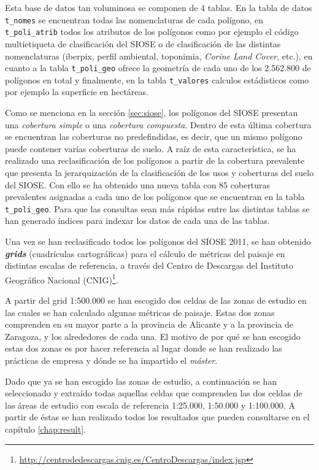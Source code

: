 Esta base de datos tan voluminosa se componen de 4 tablas. En la tabla de datos \texttt{t\_nomes} se encuentran todas las nomenclaturas de cada polígono, en \texttt{t\_poli\_atrib} todos los atributos de los polígonos como por ejemplo el código multietiqueta de clasificación del SIOSE o de clasificación de las distintas nomenclaturas (iberpix, perfil ambiental, toponimia, \textit{Corine Land Cover}, etc.), en cuanto a la tabla \texttt{t\_poli\_geo} ofrece la geometría de cada uno de los 2.562.800 de polígonos en total y finalmente, en la tabla \texttt{t\_valores} calculos estádisticos como por ejemplo la superficie en hectáreas.

Como se menciona en la sección \ref{sec:siose}, los polígonos del SIOSE presentan una \textit{cobertura simple} o una \textit{cobertura compuesta}. Dentro de esta última cobertura se encuentran las coberturas no predefindidas, es decir, que un mismo polígono puede contener varías coberturas de suelo. A raíz de esta característica, se ha realizado una reclasificación de los polígonos a partir de la cobertura prevalente que presenta la jerarquización de la clasificación de los usos y coberturas del suelo del SIOSE. Con ello se ha obtenido una nueva tabla con 85 coberturas prevalentes asignadas a cada uno de los polígonos que se encuentran en la tabla \texttt{t\_poli\_geo}. Para que las consultas sean más rápidas entre las distintas tablas se han generado índices para indexar los datos de cada una de las tablas. 

Una vez se han reclasificado todos los polígonos del SIOSE 2011, se han obtenido \textbf{\textit{grids}} (cuadrículas cartográficas) para el cálculo de métricas del paisaje en distintas escalas de referencia, a través del Centro de Descargas del Instituto Geográfico Nacional (CNIG)\footnote{\url{http://centrodedescargas.cnig.es/CentroDescargas/index.jsp}}. 

A partir del grid 1:500.000 se han escogido dos celdas de las zonas de estudio en las cuales se han calculado algunas métricas de paisaje. Estas dos zonas comprenden en su mayor parte a la provincia de Alicante y a la provincia de Zaragoza, y los alrededores de cada una. El motivo de por qué se han escogido estas dos zonas es por hacer referencia al lugar donde se han realizado las prácticas de empresa y dónde se ha impartido el \textit{máster}.

Dado que ya se han escogido las zonas de estudio, a continuación se han seleccionado y extraído todas aquellas celdas que comprenden las dos celdas de las áreas de estudio con escala de referencia 1:25.000, 1:50.000 y 1:100.000. A partir de éstas se han realizado todos los resultados que pueden consultarse en el capítulo \ref{chap:result}.


